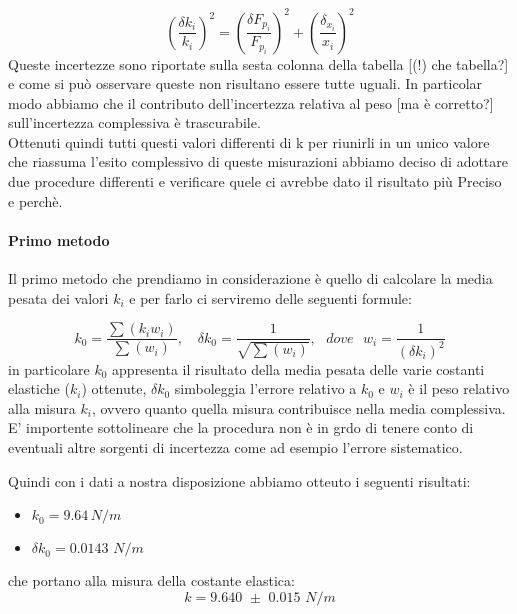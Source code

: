 \begin{equation*}
	\left(\frac{\delta {k_{i}}}{k_{i}}\right)^2  =  \left(\frac{\delta F_{p_{i}}}{F_{p_{i}}}\right)^2  +  \left(\frac{\delta_{x_{i}}}{x_{i}}\right)^2 
\end{equation*}
Queste incertezze sono riportate sulla sesta colonna della tabella [(!) che tabella?] e come si può osservare queste non risultano essere tutte uguali. In particolar modo abbiamo che il contributo dell'incertezza relativa al peso [ma è corretto?] sull'incertezza complessiva è trascurabile.\\
Ottenuti quindi tutti questi valori differenti di k per riunirli in un unico valore che riassuma l'esito complessivo di queste misurazioni abbiamo deciso di adottare due procedure differenti e verificare quele ci avrebbe dato il risultato più Preciso e perchè.

\paragraph{Primo metodo\\}
Il primo metodo che prendiamo in considerazione è quello di calcolare la media pesata dei valori $k_{i}$ e per farlo ci serviremo delle seguenti formule:

\begin{equation*}
		k_{0} = \frac{\sum (k_i w_i)}{\sum (w_i)} , \,\,\,\,\,\, \delta k_0 = \frac{1}{\sqrt{\sum (w_i)}} , \,\,\,\,dove\,\,\,\, w_i = \frac{1}{(\delta k_i)^2}
\end{equation*}
in particolare $k_0$ appresenta il risultato della media pesata delle varie costanti elastiche ($k_i$) ottenute, $\delta k_0$ simboleggia l'errore relativo a $k_0$ e $w_i$ è il peso relativo alla misura $k_i$, ovvero quanto quella misura contribuisce nella media complessiva. E' importente sottolineare che la procedura non è in grdo di tenere conto di eventuali altre sorgenti di incertezza come ad esempio l'errore sistematico.

Quindi con i dati a nostra disposizione abbiamo otteuto i seguenti risultati:
\begin{itemize}
	\item{  $  k_{0} = 9.64 \, N/m  $  }
	\item{  $  \delta k_0 = 0.0143 \,\, N/m  $  }
\end{itemize}
che portano alla misura della costante elastica:
\begin{equation}
		k = 9.640 \,\, \pm \,\, 0.015\,\,N/m
\end{equation}


